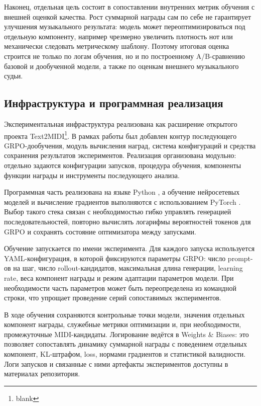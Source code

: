 \documentclass[a4paper,12pt]{extarticle}
\begin{document}
Наконец, отдельная цель состоит в сопоставлении внутренних метрик
обучения с внешней оценкой качества. Рост суммарной награды сам по себе
не гарантирует улучшения музыкального результата: модель может
переоптимизироваться под отдельную компоненту, например чрезмерно
увеличить плотность нот или механически следовать метрическому шаблону.
Поэтому итоговая оценка строится не только по логам обучения, но и по
построенному A/B-сравнению базовой и дообученной модели, а также по
оценкам внешнего музыкального судьи.

\subsection{Инфраструктура и программная реализация}

Экспериментальная инфраструктура реализована как расширение открытого
проекта Text2MIDI\footnote{blank}.
В рамках работы был добавлен контур последующего GRPO-дообучения,
модуль вычисления наград, система конфигураций и средства сохранения
результатов экспериментов. Реализация организована модульно:
отдельно задаются конфигурации запусков, процедура обучения,
компоненты функции награды и инструменты последующего анализа.

Программная часть реализована на языке Python \cite{python2026}, а
обучение нейросетевых моделей и вычисление градиентов выполняются с
использованием PyTorch \cite{pytorch2019}. Выбор такого стека связан с
необходимостью гибко управлять генерацией последовательностей, повторно
вычислять логарифмы вероятностей токенов для GRPO и сохранять состояние
оптимизатора между запусками.

Обучение запускается по имени эксперимента. Для каждого запуска
используется YAML-конфигурация, в которой фиксируются параметры GRPO:
число prompt-ов на шаг, число rollout-кандидатов, максимальная длина
генерации, learning rate, веса компонент награды и режим адаптации
параметров модели. При необходимости часть параметров может быть
переопределена из командной строки, что упрощает проведение серий
сопоставимых экспериментов.

В ходе обучения сохраняются контрольные точки модели, значения
отдельных компонент награды, служебные метрики оптимизации и,
при необходимости, промежуточные MIDI-кандидаты. Логирование ведётся в
Weights \& Biases: это позволяет сопоставлять динамику суммарной награды
с поведением отдельных компонент, KL-штрафом, loss, нормами градиентов
и статистикой валидности. Логи запусков и связанные с ними артефакты
экспериментов доступны в материалах репозитория.
\end{document}
